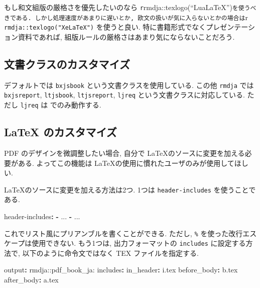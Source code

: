 \documentclass[
  xelatex,ja=standard,jafont=noto]{bxjsbook}
\newenvironment{Shaded}{\begin{snugshade}}{\end{snugshade}}
\newcommand{\AttributeTok}[1]{\textcolor[rgb]{0.77,0.63,0.00}{#1}}
\newcommand{\FunctionTok}[1]{\textcolor[rgb]{0.00,0.00,0.00}{#1}}
\newcommand{\KeywordTok}[1]{\textcolor[rgb]{0.13,0.29,0.53}{\textbf{#1}}}
\theoremstyle{definition}
\theoremstyle{definition}
\theoremstyle{definition}
\theoremstyle{definition}
\theoremstyle{remark}
\begin{document}
もし和文組版の厳格さを優先したいのなら
\texttt{r}rmdja::texlogo(``LuaLaTeX'')\texttt{を使うべきである.\ しかし処理速度があまりに遅いとか,\ 欧文の扱いが気に入らないとかの場合は}r
\texttt{rmdja::texlogo("XeLaTeX")} を使うと良い.
特に書籍形式でなくプレゼンテーション資料であれば,
組版ルールの厳格さはあまり気にならないことだろう.

\hypertarget{ux6587ux66f8ux30afux30e9ux30b9ux306eux30abux30b9ux30bfux30deux30a4ux30ba}{%
\subsection{文書クラスのカスタマイズ}\label{ux6587ux66f8ux30afux30e9ux30b9ux306eux30abux30b9ux30bfux30deux30a4ux30ba}}

デフォルトでは \texttt{bxjsbook} という文書クラスを使用している. この他
\texttt{rmdja} では \texttt{bxjsreport}, \texttt{ltjsbook},
\texttt{ltjsreport}, \texttt{ljreq} という文書クラスに対応している.
ただし \texttt{ljreq} は \LuaLaTeX でのみ動作する.

\hypertarget{latex-ux306eux30abux30b9ux30bfux30deux30a4ux30ba}{%
\subsection{LaTeX
のカスタマイズ}\label{latex-ux306eux30abux30b9ux30bfux30deux30a4ux30ba}}

PDF のデザインを微調整したい場合, 自分で
\LaTeX のソースに変更を加える必要がある. よってこの機能は
\LaTeX の使用に慣れたユーザのみが使用してほしい.

\LaTeX のソースに変更を加える方法は2つ. 1つは \texttt{header-includes}
を使うことである.

\begin{Shaded}
\begin{Highlighting}[]
\FunctionTok{header{-}includes}\KeywordTok{:}
\AttributeTok{  }\KeywordTok{{-}}\AttributeTok{ ...}
\AttributeTok{  }\KeywordTok{{-}}\AttributeTok{ ...}
\end{Highlighting}
\end{Shaded}

これでリスト風にプリアンブルを書くことができる. ただし, \texttt{\%}
を使った改行エスケープは使用できない. もう1つは, 出力フォーマットの
\texttt{includes} に設定する方法で, 以下のように命令文ではなく TEX
ファイルを指定する.

\begin{Shaded}
\begin{Highlighting}[]
\FunctionTok{output}\KeywordTok{:}\AttributeTok{ rmdja::pdf\_book\_ja:}
\AttributeTok{  }\FunctionTok{includes}\KeywordTok{:}
\AttributeTok{    }\FunctionTok{in\_header}\KeywordTok{:}\AttributeTok{ i.tex}
\AttributeTok{    }\FunctionTok{before\_body}\KeywordTok{:}\AttributeTok{ b.tex}
\AttributeTok{    }\FunctionTok{after\_body}\KeywordTok{:}\AttributeTok{ a.tex}
\end{Highlighting}
\end{Shaded}
\end{document}
